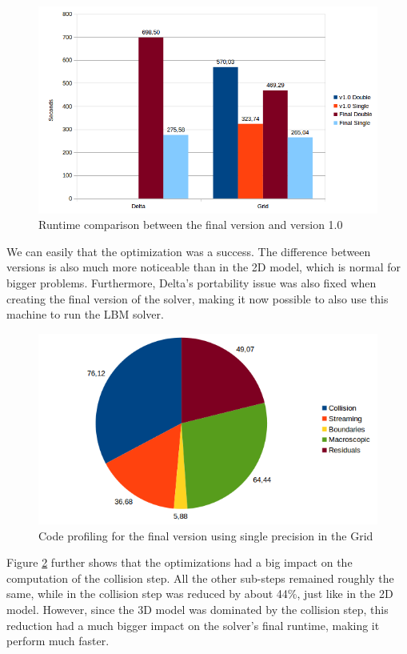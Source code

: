 \documentclass[12pt]{book}
\begin{document}
  \begin{figure}[H]
  	\centering
  	\includegraphics[width=\linewidth]{Resources/Images/vfv3d.png}
  	\caption{Runtime comparison between the final version and version 1.0}
  	\label{fig:vfv3d}
  \end{figure}
  
  We can easily that the optimization was a success. The difference between versions is also much more noticeable than in the 2D model, which is normal for bigger problems. Furthermore, Delta's portability issue was also fixed when creating the final version of the solver, making it now possible to also use this machine to run the LBM solver.
  
    \begin{figure}[H]
    	\centering
    	\includegraphics[width=\linewidth]{Resources/Images/vfv3dprofile.png}
    	\caption{Code profiling for the final version using single precision in the Grid}
    	\label{fig:vfv3dprofile}
    \end{figure}
  
  Figure \ref{fig:vfv3dprofile} further shows that the optimizations had a big impact on the computation of the collision step. All the other sub-steps remained roughly the same, while in the collision step was reduced by about 44\%, just like in the 2D model. However, since the 3D model was dominated by the collision step, this reduction had a much bigger impact on the solver's final runtime, making it perform much faster. 
  
\end{document}
